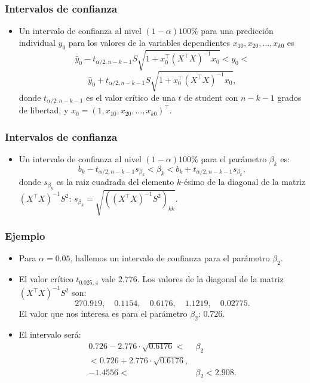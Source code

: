 \begin{frame}
\frametitle{Intervalos de confianza}
\begin{itemize}
\item<2->{Un intervalo de confianza al nivel $(1-\alpha) 100\%$ para
una predicción individual $y_0$ para los valores de la variables
dependientes $x_{10},x_{20},\ldots,x_{k0}$ es
$$ \hat{y}_0 -t_{\alpha/2,n-k-1} S\sqrt{1+x^\top_0 (X^\top X)^{-1} x_0}<y_0
<$$
$$\hat{y}_0 +t_{\alpha/2,n-k-1} S\sqrt{1+x^\top_0 (X^\top X)^{-1}
x_0},$$
donde $t_{\alpha/2,n-k-1}$ es el valor crítico de una $t$ de
student con $n-k-1$ grados de libertad, y
$x_0=\left(1,x_{10},x_{20},\ldots,x_{k0}\right)^\top.$}
\end{itemize}
\end{frame}
\begin{frame}
\frametitle{Intervalos de confianza}
\begin{itemize}
\item<2->{Un intervalo de confianza al nivel $(1-\alpha) 100\%$ para el parámetro $\beta_k$ es:
$$
b_k -t_{\alpha/2,n-k-1} s_{\beta_k} < \beta_k < b_k + t_{\alpha/2,n-k-1} s_{\beta_k},
$$
donde $s_{\beta_k}$ es la raiz cuadrada del elemento $k$-ésimo de la diagonal de la matriz $(X^\top X)^{-1} S^2$:
$s_{\beta_k} =\sqrt{\left((X^\top X)^{-1} S^2 \right)_{kk}}$.}
\end{itemize}
\end{frame}
\begin{frame}
\frametitle{Ejemplo}
\begin{itemize}
\item<2->{Para $\alpha =0.05$, hallemos un intervalo de confianza para el parámetro $\beta_2$.}
\item<3->{El valor crítico $t_{0.025,4}$ vale $2.776$. Los valores de la diagonal de la matriz $(X^\top X)^{-1} S^2$ son:
$$
270.919,\quad 0.1154,\quad 0.6176,\quad 1.1219,\quad 0.02775.
$$
El valor que nos interesa es para el parámetro $\beta_2$: $0.726$.}
\item<4->{El intervalo será:
$$
\begin{array}{rl}
0.726-2.776\cdot \sqrt{0.6176}<  & \beta_2  \\ <  0.726+2.776\cdot \sqrt{0.6176} , &\\
-1.4556 < & \beta_2 < 2.908.
\end{array}
$$}
\end{itemize}
\end{frame}

